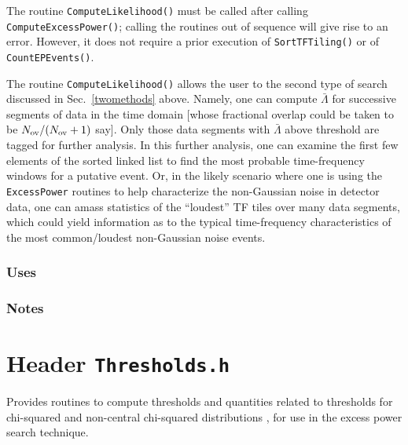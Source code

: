 The routine \verb+ComputeLikelihood()+ must be called after calling
\verb+ComputeExcessPower()+; calling the routines out of sequence will give
rise to an error.  However, it does not require a prior execution of
\verb+SortTFTiling()+ or of \verb+CountEPEvents()+.  

The routine \verb+ComputeLikelihood()+ allows the user to the second type of
search discussed in Sec.\ \ref{twomethods} above.  Namely, one can compute
${\bar \Lambda}$ for successive segments of data in the time domain [whose
fractional overlap could be taken to be $N_{\rm ov} / (N_{\rm ov} +1)$ say].
Only those data segments with ${\bar \Lambda}$ above threshold are tagged for
further analysis.  In this further analysis, one can examine the first few
elements of the sorted linked list to find the most probable time-frequency
windows for a putative event.  Or, in the likely scenario where one is using
the \verb+ExcessPower+ routines to help characterize the non-Gaussian noise in
detector data, one can amass statistics of the ``loudest'' TF tiles over many
data segments, which could yield information as to the typical time-frequency
characteristics of the most common/loudest non-Gaussian noise events.

\subsubsection*{Uses}

\subsubsection*{Notes}

\vfill{\footnotesize}




%
%
%
%
%
%
%
%




\newpage
\section{Header \texttt{Thresholds.h}}
\label{s:Thresholds.h}

\noindent Provides routines to compute thresholds and quantities related to
thresholds for chi-squared and non-central chi-squared distributions
\cite{ptvf:1992}, for use in the excess power search technique.

